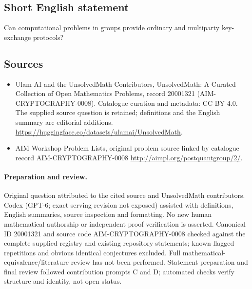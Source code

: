 \documentclass[11pt]{article}
\begin{document}
\subsection{Short English statement}
Can computational problems in groups provide ordinary and multiparty key-exchange protocols?
\subsection{Sources}
\begin{itemize}
\item[\hypertarget{source:20001321:1}{S1}] Ulam AI and the UnsolvedMath Contributors, UnsolvedMath: A Curated Collection of Open Mathematics Problems, record 20001321 (AIM-CRYPTOGRAPHY-0008). Catalogue curation and metadata: CC BY 4.0. The supplied source question is retained; definitions and the English summary are editorial additions.
\url{https://huggingface.co/datasets/ulamai/UnsolvedMath}.
\item[\hypertarget{source:20001321:2}{S2}] AIM Workshop Problem Lists, original problem source linked by catalogue record AIM-CRYPTOGRAPHY-0008
\url{http://aimpl.org/postquantgroup/2/}.
\end{itemize}
\paragraph{Preparation and review.}
Original question attributed to the cited source and UnsolvedMath contributors. Codex (GPT-6; exact serving revision not exposed) assisted with definitions, English summaries, source inspection and formatting. No new human mathematical authorship or independent proof verification is asserted. Canonical ID 20001321 and source code AIM-CRYPTOGRAPHY-0008 checked against the complete supplied registry and existing repository statements; known flagged repetitions and obvious identical conjectures excluded. Full mathematical-equivalence/literature review has not been performed. Statement preparation and final review followed contribution prompts C and D; automated checks verify structure and identity, not open status.
\label{end:20001321}
\end{document}
